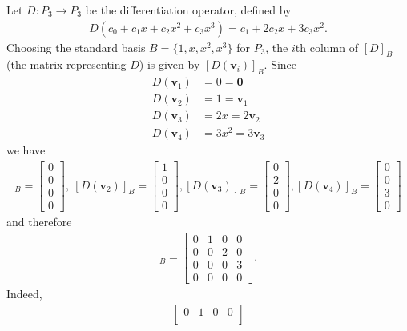 \documentclass[12pt,letterpaper,reqno]{article}
\numberwithin{equation}{section}
\newcommand{\bv}{\mathbf{v}}
\newcommand{\fixme}[1]{{\color{orange}{[#1]}}}
\begin{document}
\begin{example}
	Let $D:P_3 \to P_3$ be the differentiation operator, defined by 
	\begin{align*}
	D(c_0+c_1x+c_2x^2+c_3x^3)=c_1+2c_2x+3c_3x^2.
	\end{align*}
	Choosing the standard basis $B=\{1,x,x^2,x^3\}$ for $P_3$, the $i$th column of $[D]_B$ (the matrix representing $D$) is given by \fixme{Add reference to theorem.} $[D(\bv_i)]_B$. Since
	\begin{align*}
		D(\bv_1)&=0=\mathbf{0} \\
		D(\bv_2)&=1=\bv_1 \\
		D(\bv_3)&=2x=2\bv_2 \\
		D(\bv_4)&=3x^2=3\bv_3
	\end{align*}
	we have
	\begin{align*}
		[D(\bv_1)]_B=\begin{bmatrix}
			0 \\ 0 \\ 0 \\0
		\end{bmatrix}, \ [D(\bv_2)]_B=\begin{bmatrix}
			1 \\ 0 \\ 0 \\0
		\end{bmatrix}, [D(\bv_3)]_B=\begin{bmatrix}
			0 \\ 2 \\ 0 \\0
		\end{bmatrix}, [D(\bv_4)]_B=\begin{bmatrix}
			0 \\ 0 \\ 3 \\0
		\end{bmatrix}
	\end{align*}
	and therefore
	\begin{align*}
		[D]_B=\begin{bmatrix}
			0 & 1 & 0 & 0 \\
			0 & 0 & 2 & 0 \\
			0 & 0 & 0 & 3 \\
			0 & 0 & 0 & 0
		\end{bmatrix}.
	\end{align*}
	Indeed,
	\begin{align*}
		\begin{bmatrix}
			0 & 1 & 0 & 0 \\

\end{bmatrix}
\end{align*}
\end{example}
\end{document}
